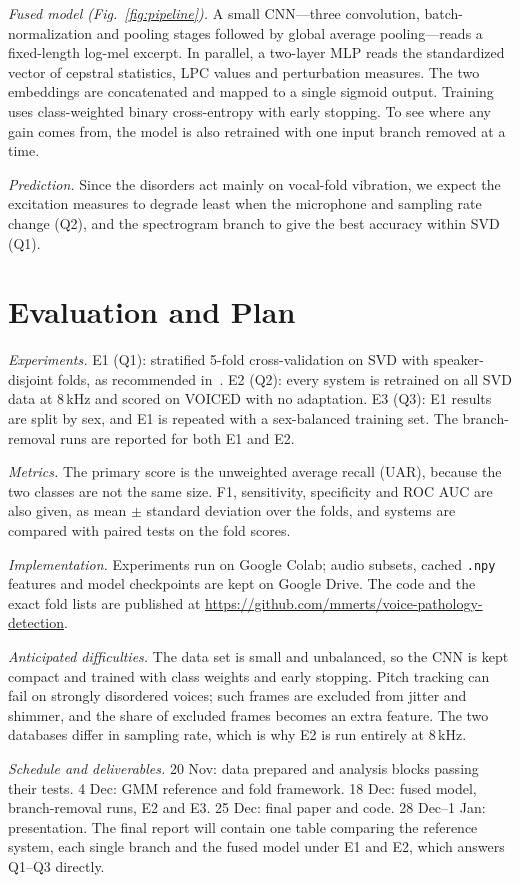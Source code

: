 \documentclass[conference]{IEEEtran}
\begin{document}
\textit{Fused model (Fig.~\ref{fig:pipeline}).} A small CNN---three convolution, batch-normalization and pooling stages followed by global average pooling---reads a fixed-length log-mel excerpt. In parallel, a two-layer MLP reads the standardized vector of cepstral statistics, LPC values and perturbation measures. The two embeddings are concatenated and mapped to a single sigmoid output. Training uses class-weighted binary cross-entropy with early stopping. To see where any gain comes from, the model is also retrained with one input branch removed at a time.

\textit{Prediction.} Since the disorders act mainly on vocal-fold vibration, we expect the excitation measures to degrade least when the microphone and sampling rate change (Q2), and the spectrogram branch to give the best accuracy within SVD (Q1).

\section{Evaluation and Plan}
\textit{Experiments.} E1 (Q1): stratified 5-fold cross-validation on SVD with speaker-disjoint folds, as recommended in~\cite{huckvale2021}. E2 (Q2): every system is retrained on all SVD data at 8\,kHz and scored on VOICED with no adaptation. E3 (Q3): E1 results are split by sex, and E1 is repeated with a sex-balanced training set. The branch-removal runs are reported for both E1 and E2.

\textit{Metrics.} The primary score is the unweighted average recall (UAR), because the two classes are not the same size. F1, sensitivity, specificity and ROC AUC are also given, as mean $\pm$ standard deviation over the folds, and systems are compared with paired tests on the fold scores.

\textit{Implementation.} Experiments run on Google Colab; audio subsets, cached \texttt{.npy} features and model checkpoints are kept on Google Drive. The code and the exact fold lists are published at \url{https://github.com/mmerts/voice-pathology-detection}.

\textit{Anticipated difficulties.} The data set is small and unbalanced, so the CNN is kept compact and trained with class weights and early stopping. Pitch tracking can fail on strongly disordered voices; such frames are excluded from jitter and shimmer, and the share of excluded frames becomes an extra feature. The two databases differ in sampling rate, which is why E2 is run entirely at 8\,kHz.

\textit{Schedule and deliverables.} 20 Nov: data prepared and analysis blocks passing their tests. 4 Dec: GMM reference and fold framework. 18 Dec: fused model, branch-removal runs, E2 and E3. 25 Dec: final paper and code. 28 Dec--1 Jan: presentation. The final report will contain one table comparing the reference system, each single branch and the fused model under E1 and E2, which answers Q1--Q3 directly.
\end{document}

